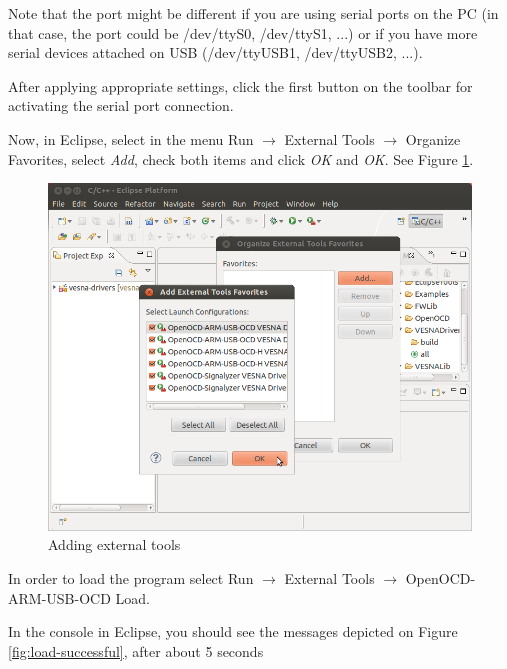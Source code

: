 \documentclass[a4paper, 10pt]{article}
\begin{document}
Note that the port might be different if you are using serial ports on the PC
(in that case, the port could be /dev/ttyS0, /dev/ttyS1, ...)
or if you have more serial devices attached on USB (/dev/ttyUSB1, /dev/ttyUSB2, ...).

After applying appropriate settings, click the first button on the toolbar for
activating the serial port connection.

Now, in Eclipse, select
in the menu
Run $\rightarrow$ External Tools $\rightarrow$ Organize Favorites,
select \emph{Add}, check both items and click \emph{OK} and \emph{OK}.
See Figure \ref{fig:compile-external-tools}.

    \begin{figure}[H]
    \centering
        \includegraphics[width=\textwidth]{./install-guide-linux-images/compile-external-tools.png}
        \caption{Adding external tools}
        \label{fig:compile-external-tools}
    \end{figure}

In order to load the program select
Run $\rightarrow$ External Tools $\rightarrow$ OpenOCD-ARM-USB-OCD Load.

In the console in Eclipse, you should see the messages depicted on
Figure \ref{fig:load-successful},
after about 5 seconds
\end{document}
